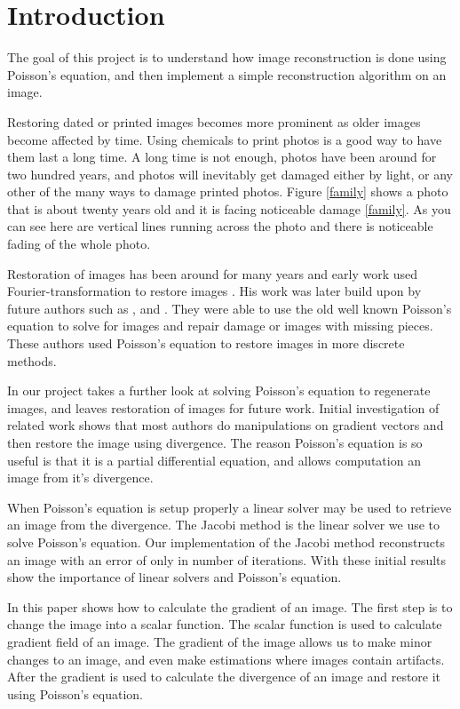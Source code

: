 \documentclass[10pt,twopage]{acmsiggraph}
\begin{document}
\section{Introduction}
\label{Intro}

The goal of this project is to understand how image reconstruction is done using Poisson's equation, and then implement a simple reconstruction algorithm on an image.

Restoring dated or printed images becomes more prominent as older images become affected by time. Using chemicals to print photos is a good way to have them last a long time. A long time is not enough, photos have been around for two hundred years, and photos will inevitably get damaged either by light, or any other of the many ways to damage printed photos. Figure \ref{family} shows a photo that is about twenty years old and it is facing noticeable damage \ref{family}. As you can see here are vertical lines running across the photo and there is noticeable fading of the whole photo. 

Restoration of images has been around for many years and early work used Fourier-transformation to restore images \cite{richardson72}. His work was later build upon by future authors such as \cite{Bertalmio}, and \cite{Perez}. They were able to use the old well known Poisson's equation to solve for images and repair damage or images with missing pieces. These authors used Poisson's equation to restore images in more discrete methods.

In our project takes a further look at solving Poisson's equation to regenerate images, and leaves restoration of images for future work. Initial investigation of related work shows that most authors do manipulations on gradient vectors and then restore the image using  divergence.  The reason Poisson's equation is so useful is that it is a partial differential equation, and allows computation an image from it's divergence. 

When Poisson's equation is setup properly a linear solver may be used to retrieve an image from the divergence. The Jacobi method is the linear solver we use to solve Poisson's equation. Our implementation of the Jacobi method reconstructs an image with an error of only \result in \iteration number of iterations. With these initial results show the importance of linear solvers and Poisson's equation.

In this paper shows how to calculate the gradient of an image. The first step is to change the image into a scalar function. The scalar function is used to calculate gradient field of an image. The gradient of the image allows us to make minor changes to an image, and even make estimations where images contain artifacts. After the gradient is used to calculate the divergence of an image and restore it using Poisson's equation. 
\end{document}
